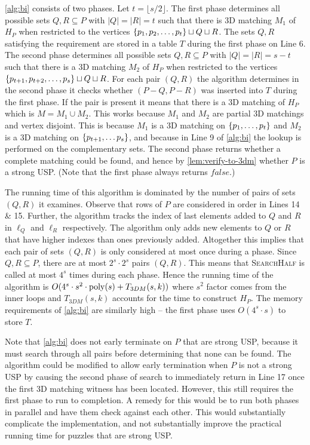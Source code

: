 \documentclass[11pt]{article}
\newcommand\sse{\subseteq}
\begin{document}
\autoref{alg:bi} consists of two phases. Let $t = \lfloor s/2
\rfloor$. The first phase determines all possible sets $Q,R \sse P$
with $|Q| = |R| = t$ such that there is 3D matching $M_1$ of $H_P$
when restricted to the vertices $\left\{ p_1,p_2, \ldots, p_t \right\} \sqcup Q
\sqcup R$.  The sets $Q,R$ satisfying the requirement are stored in a
table $T$ during the first phase on Line 6.  The second phase
determines all possible sets $Q,R \sse P$ with $|Q| = |R| = s - t$
such that there is a 3D matching $M_2$ of $H_P$ when restricted to the
vertices $\left\{ p_{t+1},p_{t+2},\ldots,p_s \right\} \sqcup Q \sqcup R$.  For
each pair $(Q,R)$ the algorithm determines in the second phase it
checks whether $(P - Q, P - R)$ was inserted into $T$ during the first
phase.  If the pair is present it means that there is a 3D matching of
$H_P$ which is $M = M_1 \cup M_2$.  This works because $M_1$ and $M_2$
are partial 3D matchings and vertex disjoint.  This is because $M_1$
is a 3D matching on $\left\{ p_1,\ldots,p_t \right\}$ and $M_2$ is a 3D matching
on $\left\{ p_{t+1},\ldots p_s \right\}$, and because in Line 9 of
\autoref{alg:bi} the lookup is performed on the complementary sets.
The second phase returns whether a complete matching could be found,
and hence by \autoref{lem:verify-to-3dm} whether $P$ is a strong USP.
(Note that the first phase always returns $false$.)

The running time of this algorithm is dominated by the number of pairs
of sets $(Q,R)$ it examines.  Observe that rows of $P$ are considered
in order in Lines 14 \& 15.  Further, the algorithm tracks the index
of last elements added to $Q$ and $R$ in $\ell_Q$ and $\ell_R$
respectively.  The algorithm only adds new elements to $Q$ or $R$ that
have higher indexes than ones previously added.  Altogether this
implies that each pair of sets $(Q,R)$ is only considered at most once
during a phase.  Since $Q, R \sse P$, there are at most $2^s \cdot
2^s$ pairs $(Q,R)$.  This means that \textsc{SearchHalf} is called at
most $4^s$ times during each phase.  Hence the running time of the
algorithm is $O(4^s \cdot s^2 \cdot \operatorname{poly}(s) + T_{3DM}(s,k))$ where
$s^2$ factor comes from the inner loops and $T_{3DM}(s,k)$ accounts
for the time to construct $H_P$.  The memory requirements of
\autoref{alg:bi} are similarly high -- the first phase uses $O(4^s
\cdot s)$ to store $T$.

Note that \autoref{alg:bi} does not early terminate on $P$ that are
strong USP, because it must search through all pairs before
determining that none can be found.  The algorithm could be modified
to allow early termination when $P$ is not a strong USP by causing the
second phase of search to immediately return in Line 17 once the first
3D matching witness has been located.  However, this still requires
the first phase to run to completion.  A remedy for this would be to
run both phases in parallel and have them check against each other.
This would substantially complicate the implementation, and not
substantially improve the practical running time for puzzles that are
strong USP.
\end{document}

